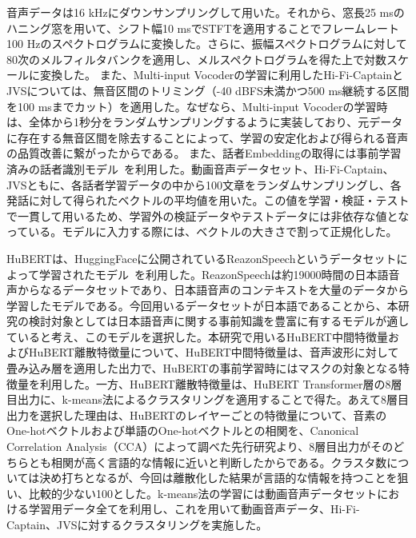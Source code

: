 \documentclass[12pt]{jarticle}
\numberwithin{equation}{section}    %
\numberwithin{figure}{section}      %
\numberwithin{table}{section}      %
\begin{document}
音声データは16 kHzにダウンサンプリングして用いた。それから、窓長25 msのハニング窓を用いて、シフト幅10 msでSTFTを適用することでフレームレート100 Hzのスペクトログラムに変換した。さらに、振幅スペクトログラムに対して80次のメルフィルタバンクを適用し、メルスペクトログラムを得た上で対数スケールに変換した。
また、Multi-input Vocoderの学習に利用したHi-Fi-CaptainとJVSについては、無音区間のトリミング（-40 dBFS未満かつ500 ms継続する区間を100 msまでカット）を適用した。なぜなら、Multi-input Vocoderの学習時は、全体から1秒分をランダムサンプリングするように実装しており、元データに存在する無音区間を除去することによって、学習の安定化および得られる音声の品質改善に繋がったからである。
また、話者Embeddingの取得には事前学習済みの話者識別モデル~\cite{wan2018generalized}を利用した。動画音声データセット、Hi-Fi-Captain、JVSともに、各話者学習データの中から100文章をランダムサンプリングし、各発話に対して得られたベクトルの平均値を用いた。この値を学習・検証・テストで一貫して用いるため、学習外の検証データやテストデータには非依存な値となっている。モデルに入力する際には、ベクトルの大きさで割って正規化した。

HuBERTは、HuggingFaceに公開されているReazonSpeechというデータセットによって学習されたモデル~\cite{rinna-japanese-hubert-base,sawada2024release}を利用した。ReazonSpeechは約19000時間の日本語音声からなるデータセットであり、日本語音声のコンテキストを大量のデータから学習したモデルである。今回用いるデータセットが日本語であることから、本研究の検討対象としては日本語音声に関する事前知識を豊富に有するモデルが適していると考え、このモデルを選択した。本研究で用いるHuBERT中間特徴量およびHuBERT離散特徴量について、HuBERT中間特徴量は、音声波形に対して畳み込み層を適用した出力で、HuBERTの事前学習時にはマスクの対象となる特徴量を利用した。一方、HuBERT離散特徴量は、HuBERT Transformer層の8層目出力に、k-means法によるクラスタリングを適用することで得た。あえて8層目出力を選択した理由は、HuBERTのレイヤーごとの特徴量について、音素のOne-hotベクトルおよび単語のOne-hotベクトルとの相関を、Canonical Correlation Analysis（CCA）によって調べた先行研究\cite{pasad2023comparative}より、8層目出力がそのどちらとも相関が高く言語的な情報に近いと判断したからである。クラスタ数については決め打ちとなるが、今回は離散化した結果が言語的な情報を持つことを狙い、比較的少ない100とした。k-means法の学習には動画音声データセットにおける学習用データ全てを利用し、これを用いて動画音声データ、Hi-Fi-Captain、JVSに対するクラスタリングを実施した。
\end{document}
